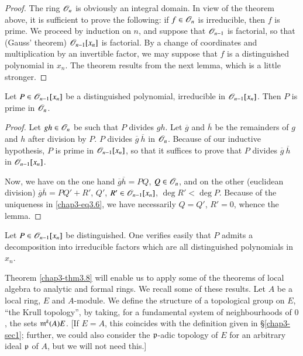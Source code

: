 \begin{proof}
The ring $\mathscr{O}_{n}$ is obviously an integral domain. In view of the theorem above, it is sufficient to prove the following: if $f\in \mathscr{O}_{n}$ is irreducible, then $f$ is prime. We proceed by induction on $n$, and suppose that $\mathscr{O}_{n-1}$ is factorial, so that (Gauss' theorem) $\mathscr{O}_{n-1}[x_{n}]$ is factorial. By a change of coordinates and multiplication by an invertible factor, we may suppose that $f$ is a distinguished polynomial in $x_{n}$. The theorem results from the next lemma, which is a little stronger.
\end{proof}

\begin{lemma}\label{chap3-lem3.10}
Let $P\in \mathscr{O}_{n-1}[x_{n}]$ be a distinguished polynomial, irreducible in $\mathscr{O}_{n-1}[x_{n}]$. Then $P$ is prime in $\mathscr{O}_{n}$.
\end{lemma}

\begin{proof}
Let $gh\in \mathscr{O}_{n}$ be such that $P$ divides $gh$. Let $\overline{g}$ and $\overline{h}$ be the remainders of $g$ and $h$ after division by $P$. $P$ divides $\overline{g} \ \overline{h}$ in $\mathscr{O}_{n}$. Because of our inductive hypothesis, $P$ is prime in $\mathscr{O}_{n-1}[x_{n}]$, so that it suffices to prove that $P$ divides $\overline{g} \ \overline{h}$ in $\mathscr{O}_{n-1}[x_{n}]$.

Now, we have on the one hand $\overline{g}\overline{h}=PQ$, $Q\in \mathscr{O}_{n}$, and on the other (euclidean division) $\overline{g}\overline{h}=PQ'+R'$, $Q'$, $R'\in \mathscr{O}_{n-1}[x_{n}]$, $\deg R'<\deg P$. Because of the uniqueness in \eqref{chap3-eq3.6}, we have necessarily $Q=Q'$, $R'=0$, whence the lemma.
\end{proof}

\begin{remark}\label{chap3-rem3.11}
Let $P\in \mathscr{O}_{n-1}[x_{n}]$ be distinguished. One verifies easily that $P$ admits a decomposition into irreducible factors which are all distinguished polynomials in $x_{n}$.
\end{remark}

Theorem \ref{chap3-thm3.8} will enable us to apply some of the theorems of local algebra to analytic and formal rings. We recall some of these results. Let $A$ be a local ring, $E$ and $A$-module. We define the structure of a topological group on $E$, ``the Krull topology'', by taking, for a fundamental system of neighbourhoods of $0$, the sets $\mathfrak{m}^{k}(A)E$. [If $E=A$, this coincides with the definition given in \S\ref{chap3-sec1}; further, we could also consider the $\mathfrak{p}$-adic topology of $E$ for an arbitrary ideal $\mathfrak{p}$ of $A$, but we will not need this.]

